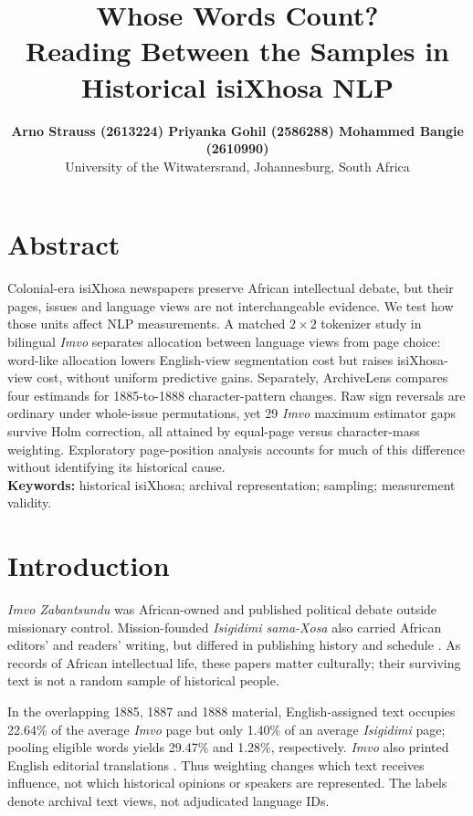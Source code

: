 \documentclass[10pt,letterpaper]{article}
\title{Whose Words Count?\\[1pt]Reading Between the Samples in Historical isiXhosa NLP}
\author{{\normalsize\bf Arno Strauss (2613224) \quad Priyanka Gohil (2586288) \quad Mohammed Bangie (2610990)}\\ University of the Witwatersrand, Johannesburg, South Africa}
\date{}
\begin{document}
\raggedbottom
\maketitle

\section{Abstract}
Colonial-era isiXhosa newspapers preserve African intellectual debate, but their pages, issues and language views are not interchangeable evidence. We test how those units affect NLP measurements. A matched $2\times2$ tokenizer study in bilingual \emph{Imvo} separates allocation between language views from page choice: word-like allocation lowers English-view segmentation cost but raises isiXhosa-view cost, without uniform predictive gains. Separately, ArchiveLens compares four estimands for 1885-to-1888 character-pattern changes. Raw sign reversals are ordinary under whole-issue permutations, yet 29 \emph{Imvo} maximum estimator gaps survive Holm correction, all attained by equal-page versus character-mass weighting. Exploratory page-position analysis accounts for much of this difference without identifying its historical cause.\\
\noindent\textbf{Keywords:} historical isiXhosa; archival representation; sampling; measurement validity.

\section{Introduction}
\emph{Imvo Zabantsundu} was African-owned and published political debate outside missionary control. Mission-founded \emph{Isigidimi sama-Xosa} also carried African editors' and readers' writing, but differed in publishing history and schedule \citep{schoots2023archive}. As records of African intellectual life, these papers matter culturally; their surviving text is not a random sample of historical people.

In the overlapping 1885, 1887 and 1888 material, English-assigned text occupies 22.64\% of the average \emph{Imvo} page but only 1.40\% of an average \emph{Isigidimi} page; pooling eligible words yields 29.47\% and 1.28\%, respectively. \emph{Imvo} also printed English editorial translations \citep{schoots2023archive}. Thus weighting changes which text receives influence, not which historical opinions or speakers are represented. The labels denote archival text views, not adjudicated language IDs.
\end{document}
